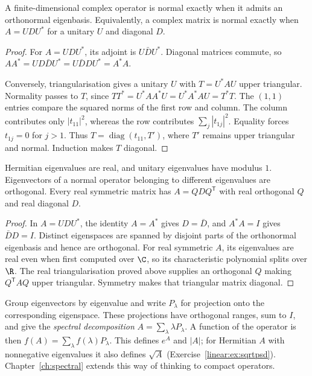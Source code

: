 \begin{theorem}\label{linear:thm:spectral}
A finite-dimensional complex operator is normal exactly when it admits an orthonormal eigenbasis. Equivalently, a complex matrix is normal exactly when $A=UDU^*$ for a unitary $U$ and diagonal $D$.
\end{theorem}
\begin{proof}
For $A=UDU^*$, its adjoint is $U\bar DU^*$. Diagonal matrices commute, so $AA^*=UD\bar DU^*=U\bar DDU^*=A^*A$.

Conversely, triangularisation gives a unitary $U$ with $T=U^*AU$ upper triangular. Normality passes to $T$, since $TT^*=U^*AA^*U=U^*A^*AU=T^*T$. The $(1,1)$ entries compare the squared norms of the first row and column. The column contributes only $|t_{11}|^2$, whereas the row contributes $\sum_j|t_{1j}|^2$. Equality forces $t_{1j}=0$ for $j>1$. Thus $T=\operatorname{diag}(t_{11},T')$, where $T'$ remains upper triangular and normal. Induction makes $T$ diagonal.
\end{proof}

\begin{corollary}\label{linear:cor:hermitian}
Hermitian eigenvalues are real, and unitary eigenvalues have modulus $1$. Eigenvectors of a normal operator belonging to different eigenvalues are orthogonal. Every real symmetric matrix has $A=QDQ^{\mathsf T}$ with real orthogonal $Q$ and real diagonal $D$.
\end{corollary}
\begin{proof}
In $A=UDU^*$, the identity $A=A^*$ gives $D=\bar D$, and $A^*A=I$ gives $\bar DD=I$. Distinct eigenspaces are spanned by disjoint parts of the orthonormal eigenbasis and hence are orthogonal. For real symmetric $A$, its eigenvalues are real even when first computed over $\C$, so its characteristic polynomial splits over $\R$. The real triangularisation proved above supplies an orthogonal $Q$ making $Q^{\mathsf T}AQ$ upper triangular. Symmetry makes that triangular matrix diagonal.
\end{proof}

Group eigenvectors by eigenvalue and write $P_\lambda$ for projection onto the corresponding eigenspace. These projections have orthogonal ranges, sum to $I$, and give the \emph{spectral decomposition} $A=\sum_\lambda\lambda P_\lambda$. A function of the operator is then $f(A)=\sum_\lambda f(\lambda)P_\lambda$. This defines $e^A$ and $|A|$; for Hermitian $A$ with nonnegative eigenvalues it also defines $\sqrt A$ (Exercise~\ref{linear:ex:sqrtpsd}). Chapter~\ref{ch:spectral} extends this way of thinking to compact operators.

